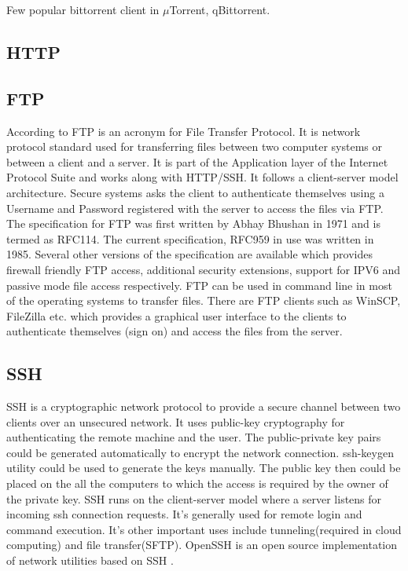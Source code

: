      Few popular bittorrent client in $\mu$Torrent, qBittorrent.

\subsection{ HTTP}
\subsection{ FTP}

     According to \cite{www-ftp-wiki} FTP is an acronym for File Transfer
     Protocol. It is network protocol standard used for transferring
     files between two computer systems or between a client and a
     server. It is part of the Application layer of the Internet
     Protocol Suite and works along with HTTP/SSH. It follows a
     client-server model architecture. Secure systems asks the client
     to authenticate themselves using a Username and Password
     registered with the server to access the files via FTP. The
     specification for FTP was first written by Abhay Bhushan
     \cite{www-rfc114} in 1971 and is termed as RFC114. The current
     specification, RFC959 in use was written in 1985. Several other
     versions of the specification are available which provides
     firewall friendly FTP access, additional security extensions,
     support for IPV6 and passive mode file access respectively. FTP
     can be used in command line in most of the operating systems to
     transfer files. There are FTP clients such as WinSCP, FileZilla
     etc. which provides a graphical user interface to the clients to
     authenticate themselves (sign on) and access the files from the
     server.
     
\subsection{ SSH}

     SSH is a cryptographic network protocol \cite{www-ssh-wiki} to
     provide a secure channel between two clients over an unsecured
     network. It uses public-key cryptography for authenticating the
     remote machine and the user. The public-private key pairs could
     be generated automatically to encrypt the network connection.
     ssh-keygen utility could be used to generate the keys manually.
     The public key then could be placed on the all the computers to
     which the access is required by the owner of the private key.
     SSH runs on the client-server model where a server listens for
     incoming ssh connection requests. It's generally used for remote
     login and command execution. It's other important uses include
     tunneling(required in cloud computing) and file transfer(SFTP).
     OpenSSH is an open source implementation of network utilities
     based on SSH \cite{www-openssh-wiki}.

